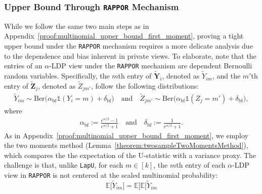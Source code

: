 \documentclass[twoside,11pt]{article}
\newcommand{\rvTwo}{Y}
\newcommand{\rvThree}{Z}
\newcommand{\vectorize}[1]{\mathbf{#1}}
\newcommand{\mE}{\mathbb{E}} %
\newcommand{\sampleIndexOne}{i}
\newcommand{\sampleIndexTwo}{j}
\newcommand{\vectorIndex}{m}
\newcommand{\privacyParameter}{\alpha} %
\newcommand{\privacyParameterrappor}{\privacyParameter_{\mathrm{bf}}}
\newcommand{\smallNumber}{\delta}
\newcommand{\smallNumberrappor}{\smallNumber_{\mathrm{bf}}}
\newcommand{\ilmun}[1]{
	{ \color{blue} Ilmun: #1}
}
\begin{document}
\begin{appendix}
	\subsubsection{Upper Bound Through \texttt{RAPPOR} Mechanism}\label{proof:rappor_optimal}
	While we follow the same two main steps as in Appendix~\ref{proof:multinomial_upper_bound_first_moment}, proving a tight upper bound under the \texttt{RAPPOR} mechanism requires a more delicate analysis due to the dependence and bias inherent in private views. %
	To elaborate, note that the entries of an $\privacyParameter$-LDP view under the \texttt{RAPPOR} mechanism are dependent Bernoulli random variables. Specifically, 
	the $\vectorIndex$th entry of $\tilde{\vectorize{\rvTwo}}_{i}$,
	denoted as $\tilde{\rvTwo}_{\sampleIndexOne \vectorIndex}$, 
	and
	the $\vectorIndex'$th entry of $\tilde{\vectorize{\rvThree}}_{\sampleIndexTwo}$,
	denoted as $\tilde{\rvThree}_{\sampleIndexTwo \vectorIndex'}$, 
	follow the following distributions:
	\begin{align*}
		\tilde{\rvTwo}_{\sampleIndexOne \vectorIndex}
		\sim
		\mathrm{Ber}
		\bigl(
		\privacyParameterrappor \mathds{1}
		(
		\rvTwo_{\sampleIndexOne} = \vectorIndex
		) + \smallNumberrappor
		\bigr)
		\quad \text{and} \quad 
		\tilde{\rvThree}_{\sampleIndexTwo \vectorIndex'}
		\sim
		\mathrm{Ber}
		\bigl(
		\privacyParameterrappor \mathds{1}
		(
		\rvThree_{\sampleIndexTwo} = \vectorIndex'
		) + \smallNumberrappor
		\bigr),
	\end{align*}
	where 
	\begin{align*}
		\privacyParameterrappor := \frac{e^{\privacyParameter /2} -1}{e^{\privacyParameter /2} +1}\quad \text{and} \quad
		\smallNumberrappor := \frac{1}{e^{\privacyParameter /2} +1}.
	\end{align*}
	As in Appendix~\ref{proof:multinomial_upper_bound_first_moment}, we employ the two moments method (Lemma~\ref{theorem:twosampleTwoMomentsMethod}), which compares the the expectation of the U-statistic with a variance proxy.
	The challenge is that, unlike \texttt{LapU}, for each $m \in [k]$, the $m$th entry of each $\privacyParameter$-LDP view in \texttt{RAPPOR} is not centered at the scaled multinomial probability:
	\begin{equation}\label{equation:rappor_expecation}
		\mE
		\bigl[
		\tilde{\rvTwo}_{\sampleIndexOne \vectorIndex}
		\bigr]
		=
		\mE
		\bigl[
		\mE %
		\bigl[
		\tilde{\rvTwo}_{\sampleIndexOne \vectorIndex} %

\end{equation}
\end{appendix}
\end{document}
